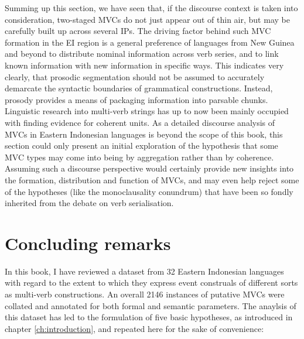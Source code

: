 Summing up this section, we have seen that, if the discourse context is taken into consideration, two-staged MVCs do not just appear out of thin air, but may be carefully built up across several IPs. The driving factor behind such MVC formation in the EI region is a general preference of languages from New Guinea and beyond to distribute nominal information across verb series, and to link known information with new information in specific ways. This indicates very clearly, that prosodic segmentation should not be assumed to accurately demarcate the syntactic boundaries of grammatical constructions. Instead, prosody provides a means of packaging information into parsable chunks. Linguistic research into multi-verb strings has up to now been mainly occupied with finding evidence for coherent units. As a detailed discourse analysis of MVCs in Eastern Indonesian languages is beyond the scope of this book, this section could only present an initial exploration of the hypothesis that some MVC types may come into being by aggregation rather than by coherence. Assuming such a discourse perspective would certainly provide new insights into the formation, distribution and function of MVCs, and may even help reject some of the hypotheses (like the monoclausality conundrum) that have been so fondly inherited from the debate on verb serialisation.

\section{Concluding remarks} \label{sec:concluding}

In this book, I have reviewed a dataset from 32 Eastern Indonesian languages with regard to the extent to which they express event construals of different sorts as multi-verb constructions. An overall 2146 instances of putative MVCs were collated and annotated for both formal and semantic parameters. The anaylsis of this dataset has led to the formulation of five basic hypotheses, as introduced in chapter \ref{ch:introduction}, and repeated here for the sake of convenience:

